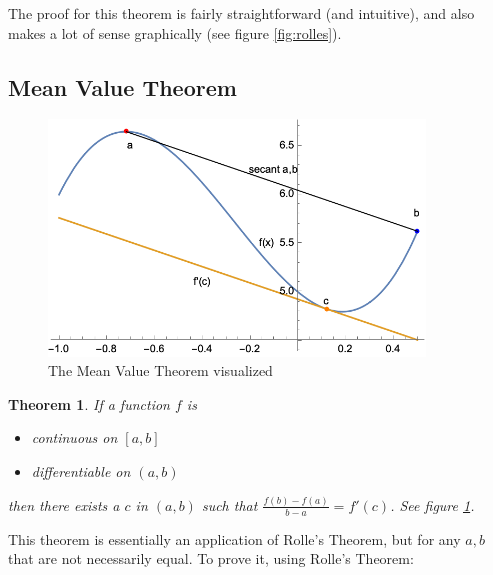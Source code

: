 \documentclass[12pt]{article}
\newtheorem{theorem}{Theorem}
\begin{document}
The proof for this theorem is fairly straightforward (and intuitive), and also makes a lot of sense graphically (see figure \ref{fig:rolles}).

\subsection{Mean Value Theorem}
\begin{figure}[!ht]
    \centering
    \includegraphics[width=10cm]{misc/mvt.png}
    \caption{The Mean Value Theorem visualized}
    \label{fig:mvt}
\end{figure}
\begin{theorem}
    If a function $f$ is
    \begin{itemize}
        \item \textit{continuous} on $[a,b]$
        \item \textit{differentiable} on $(a,b)$
    \end{itemize}
    then there exists a $c$ in $(a,b)$ such that $\frac{f(b)-f(a)}{b-a} = f'(c)$. See figure \ref{fig:mvt}.
\end{theorem}

This theorem is essentially an application of Rolle's Theorem, but for any $a,b$ that are not necessarily equal. To prove it, using Rolle's Theorem:
\end{document}

